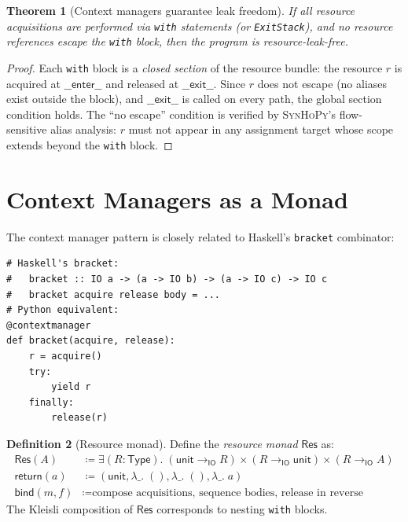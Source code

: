 \documentclass[11pt,a4paper]{report}
\theoremstyle{definition}
\newtheorem{definition}{Definition}[chapter]
\theoremstyle{plain}
\newtheorem{theorem}[definition]{Theorem}
\newcommand{\Type}{\mathsf{Type}}
\newcommand{\defeq}{\coloneqq}
\newcommand{\IO}{\mathsf{IO}}
\newcommand{\synhopy}{\textsc{SynHoPy}}
\begin{document}
\begin{theorem}[Context managers guarantee leak freedom]
If all resource acquisitions are performed via \texttt{with} statements
(or \lstinline[style=python]{ExitStack}), and no resource references
escape the \texttt{with} block, then the program is resource-leak-free.
\end{theorem}
\begin{proof}
Each \texttt{with} block is a \emph{closed section} of the resource bundle:
the resource $r$ is acquired at $\mathsf{\_\_enter\_\_}$ and released at
$\mathsf{\_\_exit\_\_}$.  Since $r$ does not escape (no aliases exist outside
the block), and $\mathsf{\_\_exit\_\_}$ is called on every path, the global
section condition holds.  The ``no escape'' condition is verified by
\synhopy{}'s flow-sensitive alias analysis: $r$ must not appear in any
assignment target whose scope extends beyond the \texttt{with} block.
\end{proof}

\section{Context Managers as a Monad}

The context manager pattern is closely related to Haskell's
\lstinline[style=python]{bracket} combinator:

\begin{lstlisting}[style=python]
# Haskell's bracket:
#   bracket :: IO a -> (a -> IO b) -> (a -> IO c) -> IO c
#   bracket acquire release body = ...
# Python equivalent:
@contextmanager
def bracket(acquire, release):
    r = acquire()
    try:
        yield r
    finally:
        release(r)
\end{lstlisting}

\begin{definition}[Resource monad]
Define the \emph{resource monad} $\mathsf{Res}$ as:
\begin{align}
  \mathsf{Res}(A) &\defeq \exists (R : \Type).\;
    (\mathsf{unit} \to_\IO R) \times (R \to_\IO \mathsf{unit})
    \times (R \to_\IO A) \\
  \mathsf{return}(a) &\defeq (\mathsf{unit}, \lambda\_.\;(), \lambda\_.\;(),
    \lambda\_.\;a) \\
  \mathsf{bind}(m, f) &\defeq \text{compose acquisitions, sequence bodies,
    release in reverse}
\end{align}
The Kleisli composition of $\mathsf{Res}$ corresponds to nesting
\texttt{with} blocks.
\end{definition}
\end{document}
